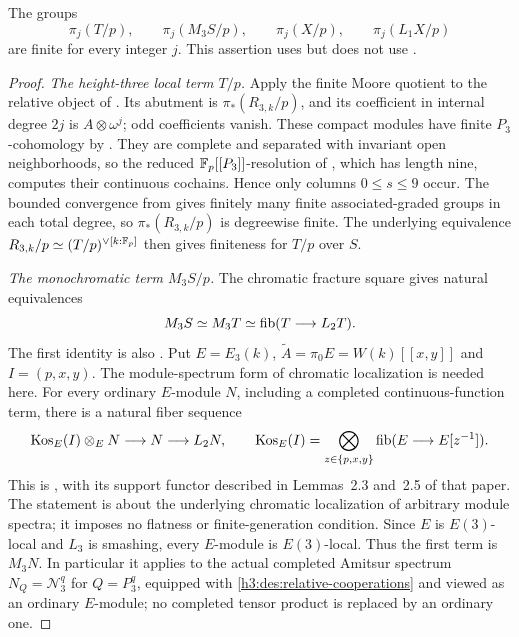 \begin{lemma}\label{h3:des:monochromatic-finiteness}
The groups
\[
 \pi_j(T/p),\qquad \pi_j(M_3S/p),\qquad
 \pi_j(X/p),\qquad \pi_j(L_1X/p)
\]
are finite for every integer \(j\).  This assertion uses
 but does not use
.
\end{lemma}

\begin{proof}
\emph{The height-three local term \(T/p\).}
Apply the finite Moore quotient to the relative object of
.  Its abutment is
\(\pi_*(R_{3,k}/p)\), and its coefficient in internal degree
\(2j\) is \(A\otimes\omega^j\); odd coefficients vanish.
These compact modules have finite \(P_3\)-cohomology by
.  They are complete and
separated with invariant open neighborhoods, so the reduced
\(\mathbb F_p[[P_3]]\)-resolution of ,
which has length nine, computes their continuous cochains.  Hence only
columns \(0\leq s\leq9\) occur.  The bounded convergence from
 gives finitely many finite associated-graded
groups in each total degree, so \(\pi_*(R_{3,k}/p)\) is degreewise
finite.  The underlying equivalence
\(R_{3,k}/p\simeq(T/p)^{\vee [k:\mathbb F_p]}\) then gives finiteness for
\(T/p\) over \(S\).

\emph{The monochromatic term \(M_3S/p\).}
The chromatic fracture square gives natural equivalences
\[
 M_3S\simeq M_3T\simeq\operatorname{fib}(T\longrightarrow L_2T).
\]
The first identity is also \cite[Theorem~6.19]{HS99}.
Put $E=E_3(k)$, $\widetilde A=\pi_0E=W(k)[[x,y]]$ and
$I=(p,x,y)$. The module-spectrum form of chromatic localization is
needed here. For every ordinary $E$-module $N$, including a completed
continuous-function term, there is a natural fiber sequence
\[
 \operatorname{Kos}_E(I)\otimes_E N\longrightarrow N
       \longrightarrow L_2N,
 \qquad
 \operatorname{Kos}_E(I)=
 \bigotimes_{z\in\{p,x,y\}}\operatorname{fib}(E\longrightarrow E[z^{-1}]).
\]
This is \cite[Proposition~3.4(1) and Remark~3.5]{BarthelStapleton2016},
with its support functor described in Lemmas~2.3 and~2.5 of that paper.
The statement is about the underlying chromatic localization of
arbitrary module spectra; it imposes no flatness or finite-generation
condition. Since $E$ is $E(3)$-local and $L_3$ is smashing, every
$E$-module is $E(3)$-local. Thus the first term is $M_3N$.
In particular it applies to the actual completed Amitsur spectrum
$N_Q=\mathcal N_3^q$ for $Q=P_3^q$, equipped with
\eqref{h3:des:relative-cooperations} and viewed as an ordinary
$E$-module; no completed tensor product is replaced by an ordinary one.


\end{proof}
